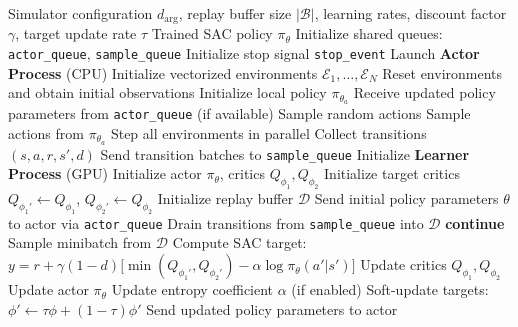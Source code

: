 \documentclass{article}
\begin{document}
\begin{algorithm}[H]
\caption{Asynchronous SAC with Parallel Environments~\citep{liu2025asynchronous}}
\label{alg:async_sac}
\begin{algorithmic}[1]
\Require Simulator configuration $d_{\text{arg}}$, replay buffer size
         $|\mathcal{B}|$, learning rates, discount factor $\gamma$,
         target update rate $\tau$
\Ensure Trained SAC policy $\pi_\theta$
\State Initialize shared queues: \texttt{actor\_queue}, \texttt{sample\_queue}
\State Initialize stop signal \texttt{stop\_event}
\State Launch \textbf{Actor Process} (CPU)
\Statex \quad Initialize vectorized environments $\mathcal{E}_1, \dots, \mathcal{E}_N$
\Statex \quad Reset environments and obtain initial observations
\Statex \quad Initialize local policy $\pi_{\theta_a}$
    \State Receive updated policy parameters from \texttt{actor\_queue} (if available)
        \State Sample random actions
    \Else
        \State Sample actions from $\pi_{\theta_a}$
    \EndIf
    \State Step all environments in parallel
    \State Collect transitions $(s, a, r, s', d)$
    \State Send transition batches to \texttt{sample\_queue}
\EndWhile
\State Initialize \textbf{Learner Process} (GPU)
\State Initialize actor $\pi_\theta$, critics $Q_{\phi_1}, Q_{\phi_2}$
\State Initialize target critics $Q_{\phi_1'} \leftarrow Q_{\phi_1}$,
       $Q_{\phi_2'} \leftarrow Q_{\phi_2}$
\State Initialize replay buffer $\mathcal{D}$
\State Send initial policy parameters $\theta$ to actor via \texttt{actor\_queue}
    \State Drain transitions from \texttt{sample\_queue} into $\mathcal{D}$
        \State \textbf{continue}
    \EndIf
        \State Sample minibatch from $\mathcal{D}$
        \State Compute SAC target:
        $y = r + \gamma (1-d)\bigl[\min(Q_{\phi_1'}, Q_{\phi_2'})
             - \alpha \log \pi_\theta(a'|s')\bigr]$
        \State Update critics $Q_{\phi_1}, Q_{\phi_2}$
        \State Update actor $\pi_\theta$
        \State Update entropy coefficient $\alpha$ (if enabled)
        \State Soft-update targets:
        $\phi' \leftarrow \tau \phi + (1-\tau)\phi'$
    \EndFor
        \State Send updated policy parameters to actor
    \EndIf
\EndWhile
\end{algorithmic}
\end{algorithm}
\end{document}
